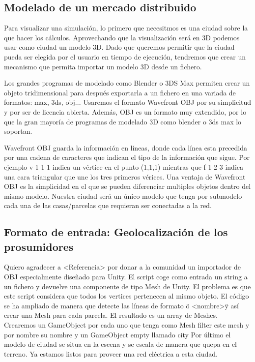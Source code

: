 \documentclass[12pt,a4paper,openright,oneside]{article}
\numberwithin{equation}{section}
\theoremstyle{definition}
\begin{document}
\subsection{Modelado de un mercado distribuido}
Para visualizar una simulación, lo primero que necesitmos es una ciudad sobre la que hacer los cálculos. Aprovechando que la visualización será en 3D podemos usar como ciudad un modelo 3D. Dado que queremos permitir que la ciudad pueda ser elegida por el usuario en tiempo de ejecución, tendremos que crear un mecanismo que permita importar un modelo 3D desde un fichero.

Los grandes programas de modelado como Blender o 3DS Max permiten crear un objeto tridimensional para después exportarla a un fichero en una variada de formatos: max, 3ds, obj... Usaremos el formato Wavefront OBJ por su simplicitud y por ser de licencia abierta. Además, OBJ es un formato muy extendido, por lo que la gran mayoría de programas de modelado 3D como blender o 3ds max lo soportan.

Wavefront OBJ guarda la información en líneas, donde cada línea esta precedida por una cadena de caracteres que indican el tipo de la información que sigue. Por ejemplo v 1 1 1 indica un vértice en el punto (1,1,1) mientras que f 1 2 3 indica una cara triangular que une los tres primeros vérices.
Una ventaja de Wavefront OBJ es la simplicidad en el que se pueden diferenciar multiples objetos dentro del mismo modelo. Nuestra ciudad será un único modelo que tenga por submodelo cada una de las casas/parcelas que requieran ser conectadas a la red. 

\subsection{Formato de entrada: Geolocalización de los prosumidores}
Quiero agradecer a <Referencia> por donar a la comunidad un importador de OBJ especialmente diseñado para Unity. El script coge como entrada un string a un fichero y devuelve una componente de tipo Mesh de Unity. El problema es que este script considera que todos los vertices pertenecen al mismo objeto. El código se ha ampliado de manera que detecte las líneas de formato \"o <nombre>\" y así crear una Mesh para cada parcela. El resultado es un array de Meshes. Crearemos un GameObject por cada uno que tenga como Mesh filter este mesh y por nombre su nombre y un GameObject empty llamado city 
Por último el modelo de ciudad se situa en la escena y se escala de manera que quepa en el terreno. Ya estamos listos para proveer una red eléctrica a esta ciudad.
\end{document}

